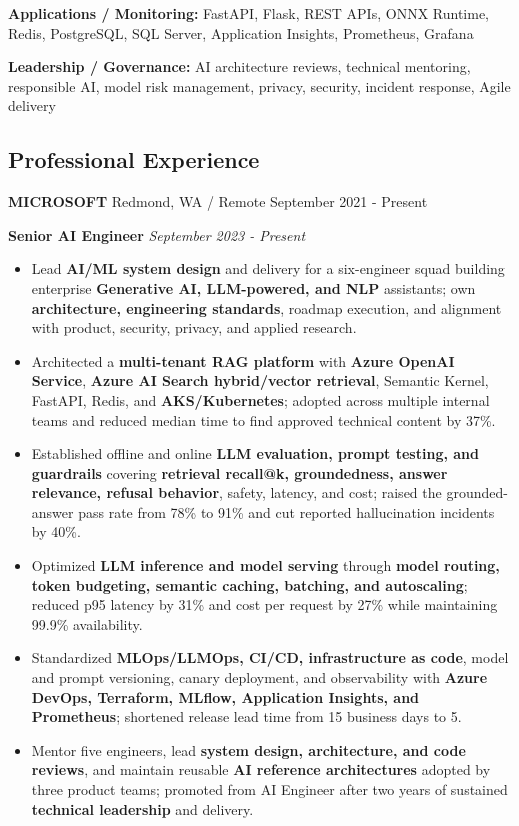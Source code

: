 \documentclass[10pt,letterpaper]{article}
\renewcommand{\emph}[1]{{\fontsize{9.5}{10.26}\selectfont\color{ResumeDates}\itshape #1}}
\providecommand{\tightlist}{%
  \setlength{\itemsep}{2.25pt}\setlength{\parskip}{0pt}}
\begin{document}
\textbf{Applications / Monitoring:} FastAPI, Flask, REST APIs, ONNX
Runtime, Redis, PostgreSQL, SQL Server, Application Insights,
Prometheus, Grafana

\textbf{Leadership / Governance:} AI architecture reviews, technical
mentoring, responsible AI, model risk management, privacy, security,
incident response, Agile delivery

\subsection{Professional Experience}\label{professional-experience}

\fontsize{10}{10.8}\selectfont\color{ResumeCompanyMeta}\setlength{\parskip}{1pt}
\renewcommand{\textbf}[1]{\textcolor{ResumeBody}{\bfseries #1}}

\textbf{MICROSOFT} \textbar{} Redmond, WA / Remote \textbar{} September
2021 - Present

\textbf{Senior AI Engineer} \textbar{} \emph{September 2023 - Present}

\begin{itemize}
\tightlist
\item
  Lead \textbf{AI/ML system design} and delivery for a six-engineer
  squad building enterprise \textbf{Generative AI, LLM-powered, and NLP}
  assistants; own \textbf{architecture, engineering standards}, roadmap
  execution, and alignment with product, security, privacy, and applied
  research.
\item
  Architected a \textbf{multi-tenant RAG platform} with \textbf{Azure
  OpenAI Service}, \textbf{Azure AI Search hybrid/vector retrieval},
  Semantic Kernel, FastAPI, Redis, and \textbf{AKS/Kubernetes}; adopted
  across multiple internal teams and reduced median time to find
  approved technical content by 37\%.
\item
  Established offline and online \textbf{LLM evaluation, prompt testing,
  and guardrails} covering \textbf{retrieval recall@k, groundedness,
  answer relevance, refusal behavior}, safety, latency, and cost; raised
  the grounded-answer pass rate from 78\% to 91\% and cut reported
  hallucination incidents by 40\%.
\item
  Optimized \textbf{LLM inference and model serving} through
  \textbf{model routing, token budgeting, semantic caching, batching,
  and autoscaling}; reduced p95 latency by 31\% and cost per request by
  27\% while maintaining 99.9\% availability.
\item
  Standardized \textbf{MLOps/LLMOps, CI/CD, infrastructure as code},
  model and prompt versioning, canary deployment, and observability with
  \textbf{Azure DevOps, Terraform, MLflow, Application Insights, and
  Prometheus}; shortened release lead time from 15 business days to 5.
\item
  Mentor five engineers, lead \textbf{system design, architecture, and
  code reviews}, and maintain reusable \textbf{AI reference
  architectures} adopted by three product teams; promoted from AI
  Engineer after two years of sustained \textbf{technical leadership}
  and delivery.
\end{itemize}
\end{document}
